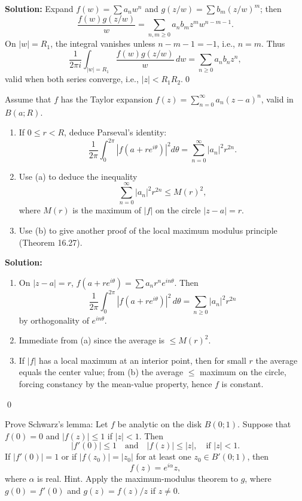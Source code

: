 \bigskip\noindent\textbf{Solution:}
Expand $f(w)=\sum a_n w^n$ and $g(z/w)=\sum b_m (z/w)^m$; then
\[\frac{f(w)g(z/w)}{w}=\sum_{n,m\ge0} a_n b_m z^m w^{n-m-1}.\]
On $|w|=R_1$, the integral vanishes unless $n-m-1=-1$, i.e., $n=m$. Thus
\[\frac{1}{2\pi i}\int_{|w|=R_1}\frac{f(w)g(z/w)}{w}\,dw=\sum_{n\ge0} a_n b_n z^n,\]
valid when both series converge, i.e., $|z|<R_1R_2$.\qed


\begin{problembox}
Assume that \( f \) has the Taylor expansion \( f(z) = \sum_{n=0}^{\infty} a_n (z - a)^n \), valid in \( B(a; R) \).
\begin{enumerate}[label=(\alph*)]
\item If \( 0 \leq r < R \), deduce Parseval's identity:
\[ \frac{1}{2\pi} \int_0^{2\pi} |f(a + r e^{i\theta})|^2 d\theta = \sum_{n=0}^{\infty} |a_n|^2 r^{2n}. \]
\item Use (a) to deduce the inequality
\[ \sum_{n=0}^{\infty} |a_n|^2 r^{2n} \leq M(r)^2, \]
where \( M(r) \) is the maximum of \( |f| \) on the circle \( |z - a| = r \).
\item Use (b) to give another proof of the local maximum modulus principle (Theorem 16.27).
\end{enumerate}
\end{problembox}

\bigskip\noindent\textbf{Solution:}
\begin{enumerate}[label=(\alph*)]
\item On $|z-a|=r$, $f(a+re^{i\theta})=\sum a_n r^n e^{in\theta}$. Then
\[\frac{1}{2\pi}\int_0^{2\pi}|f(a+re^{i\theta})|^2\,d\theta=\sum_{n\ge0}|a_n|^2 r^{2n}\]
by orthogonality of $e^{in\theta}$.
\item Immediate from (a) since the average is $\le M(r)^2$.
\item If $|f|$ has a local maximum at an interior point, then for small $r$ the average equals the center value; from (b) the average $\le$ maximum on the circle, forcing constancy by the mean-value property, hence $f$ is constant.
\end{enumerate}\qed


\begin{problembox}
Prove Schwarz's lemma: Let \( f \) be analytic on the disk \( B(0; 1) \). Suppose that \( f(0) = 0 \) and \( |f(z)| \leq 1 \) if \( |z| < 1 \). Then
\[ |f'(0)| \leq 1 \quad \text{and} \quad |f(z)| \leq |z|, \quad \text{if } |z| < 1. \]
If \( |f'(0)| = 1 \) or if \( |f(z_0)| = |z_0| \) for at least one \( z_0 \in B'(0; 1) \), then
\[ f(z) = e^{i\alpha} z, \]
where \( \alpha \) is real. Hint. Apply the maximum-modulus theorem to \( g \), where \( g(0) = f'(0) \) and \( g(z) = f(z)/z \) if \( z \neq 0 \).
\end{problembox}


